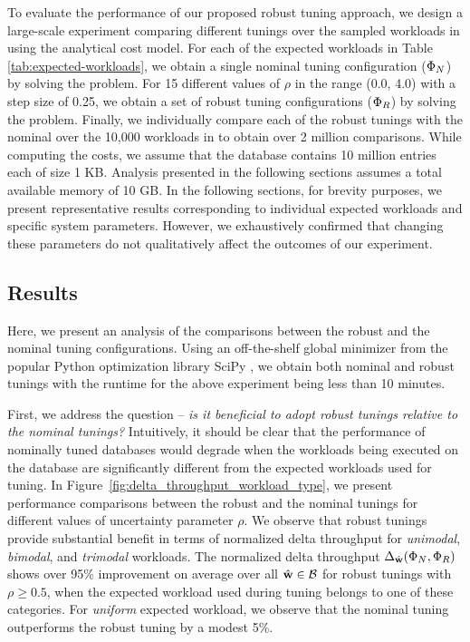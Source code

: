 To evaluate the performance of our proposed robust tuning approach, 
    we design a large-scale experiment comparing different tunings
    over the sampled workloads in {\benchmark} using the analytical cost
    model.
For each of the expected workloads in Table \ref{tab:expected-workloads},
    we obtain a single nominal tuning configuration (${{{\Phi}}_N}$) by 
    solving the {\nominal} problem. 
For 15 different values of $\rho$ in the range (0.0, 4.0) with a step size of
    0.25, we obtain a set of robust tuning configurations (${{\Phi}}_R$)
    by solving the {\robustw} problem.
Finally, we individually compare each of the robust tunings with the nominal
    over the 10,000 workloads in {\benchmark} to obtain over 2 million
    comparisons.
While computing the costs, we assume that the database contains 10 million
    entries each of size 1 KB. 
Analysis presented in the following sections assumes a total available memory of
    10 GB.
In the following sections, for brevity purposes, we present representative 
    results  corresponding to individual expected workloads and specific system 
    parameters.
However, we exhaustively confirmed that changing these parameters do not 
    qualitatively affect the outcomes of our experiment.

\subsection{Results}
\label{sec:model-results}
Here, we present an analysis of the comparisons between the robust and 
    the nominal tuning configurations.
Using an off-the-shelf global minimizer from the popular Python optimization
    library SciPy \cite{2020SciPy-NMeth}, we obtain both nominal and robust
    tunings with the runtime for the above experiment being less than 10
    minutes.

First, we address the question -- \textit{is it beneficial to adopt robust tunings
    relative to the nominal tunings?}
Intuitively, it should be clear that the performance of nominally tuned databases
    would degrade when the workloads being executed on the database are 
    significantly different from the expected workloads used for tuning.
In Figure~\ref{fig:delta_throughput_workload_type},
    we present performance comparisons between the robust and the nominal 
    tunings for different values of uncertainty parameter $\rho$.
We observe that robust tunings provide substantial benefit in terms of normalized
    delta throughput for \emph{unimodal}, \emph{bimodal}, and \emph{trimodal} 
    workloads.
The normalized delta throughput 
    $\Delta_{{\hat{\bf{w}}}}({{\Phi}}_N, {{\Phi}}_R)$
    shows over 95\% improvement on average over all ${{\hat{\bf{w}}}} \in {{\ensuremath{\mathcal{B}}}}$ 
    for robust tunings with $\rho \geq 0.5$, 
    when the expected workload used during tuning belongs to one of these 
    categories.
For \emph{uniform} expected workload, we observe that the nominal tuning outperforms the 
    robust tuning by a modest 5\%.

